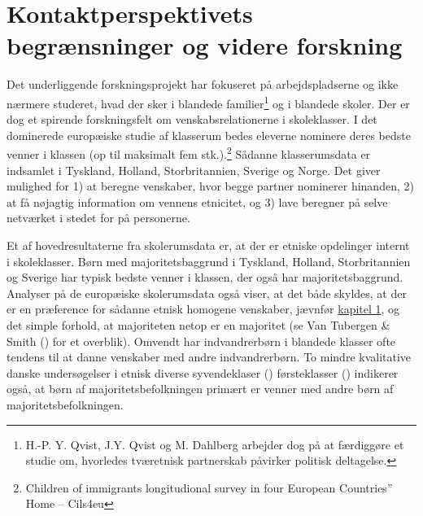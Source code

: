 \documentclass[
]{book}
\begin{document}
\section{Kontaktperspektivets begrænsninger og videre forskning}\label{kontaktperspektivets-begruxe6nsninger-og-videre-forskning}

Det underliggende forskningsprojekt har fokuseret på arbejdspladserne og ikke nærmere studeret, hvad der sker i blandede familier\footnote{H.-P. Y. Qvist, J.Y. Qvist og M. Dahlberg arbejder dog på at færdiggøre et studie om, hvorledes tværetnisk partnerskab påvirker politisk deltagelse.} og i blandede skoler. Der er dog et spirende forskningsfelt om venskabsrelationerne i skoleklasser. I det dominerede europæiske studie af klasserum bedes eleverne nominere deres bedste venner i klassen (op til maksimalt fem stk.).\footnote{Children of immigrants longitudional survey in four European Countries'' Home -- Cils4eu} Sådanne klasserumsdata er indsamlet i Tyskland, Holland, Storbritannien, Sverige og Norge. Det giver mulighed for 1) at beregne venskaber, hvor begge partner nominerer hinanden, 2) at få nøjagtig information om vennens etnicitet, og 3) lave beregner på selve netværket i stedet for på personerne.

Et af hovedresultaterne fra skolerumsdata er, at der er etniske opdelinger internt i skoleklasser. Børn med majoritetsbaggrund i Tyskland, Holland, Storbritannien og Sverige har typisk bedste venner i klassen, der også har majoritetsbaggrund. Analyser på de europæiske skolerumsdata også viser, at det både skyldes, at der er en præference for sådanne etnisk homogene venskaber, jævnfør \hyperref[kap1]{kapitel 1}, og det simple forhold, at majoriteten netop er en majoritet (se Van Tubergen \& Smith () for et overblik). Omvendt har indvandrerbørn i blandede klasser ofte tendens til at danne venskaber med andre indvandrerbørn. To mindre kvalitative danske undersøgelser i etnisk diverse syvendeklaser () førsteklasser () indikerer også, at børn af majoritetsbefolkningen primært er venner med andre børn af majoritetsbefolkningen.
\end{document}
